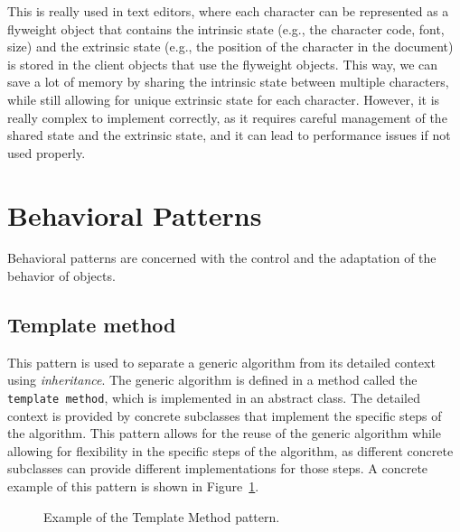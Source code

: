 This is really used in text editors, where each character can be represented as a flyweight object that contains the intrinsic state (e.g., the character code, font, size) and the extrinsic state (e.g., the position of the character in the document) is stored in the client objects that use the flyweight objects. This way, we can save a lot of memory by sharing the intrinsic state between multiple characters, while still allowing for unique extrinsic state for each character. However, it is really complex to implement correctly, as it requires careful management of the shared state and the extrinsic state, and it can lead to performance issues if not used properly.

\section{Behavioral Patterns}

Behavioral patterns are concerned with the control and the adaptation of the behavior of objects.

\subsection{Template method}

This pattern is used to separate a generic algorithm from its detailed context using \emph{inheritance}. The generic algorithm is defined in a method called the \texttt{template method}, which is implemented in an abstract class. The detailed context is provided by concrete subclasses that implement the specific steps of the algorithm. This pattern allows for the reuse of the generic algorithm while allowing for flexibility in the specific steps of the algorithm, as different concrete subclasses can provide different implementations for those steps. A concrete example of this pattern is shown in Figure~\ref{fig:template-method}.
\begin{figure}
    \centering
    \caption{Example of the Template Method pattern.}
    \label{fig:template-method}
\end{figure}


